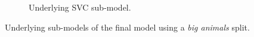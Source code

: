 \begin{figure}[ht]
\begin{subfigure}{.45\textwidth}
        \captionsetup{width=0.8\linewidth}
        \captionsetup{justification=centering}
        \caption{Underlying SVC sub-model.}
    \end{subfigure}
    \captionsetup{width=0.9\linewidth}
    \captionsetup{justification=centering}
    \caption{Underlying sub-models of the final model using a \textit{big animals} split.}
\end{figure}

